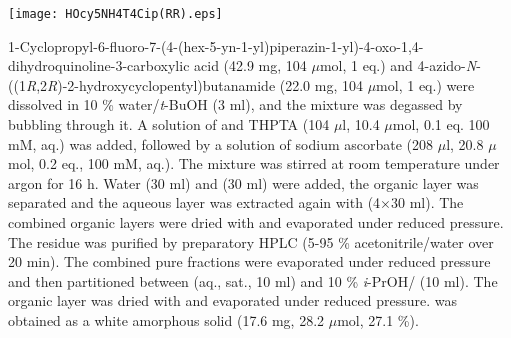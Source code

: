 
\begin{scheme}[H]
	\begin{center}
		\texttt{[image: HOcy5NH4T4Cip(RR).eps]}
	\end{center}
\end{scheme}

1-Cyclopropyl-6-fluoro-7-(4-(hex-5-yn-1-yl)piperazin-1-yl)-4-oxo-1,4\hyp{}dihydro\-quinoline-3-carboxylic acid  (42.9 mg, 104 $\mu$mol, 1 eq.) and 4\hyp{}azido\hyp{}\textit{N}\hyp{}((1\textit{R},2\textit{R})\hyp{}2\hyp{}hydroxycyclopentyl)butanamide  (22.0 mg, 104 $\mu$mol, 1 eq.) were dissolved in 10 \% water/\textit{t}-BuOH (3 ml), and the mixture was degassed by bubbling  through it. 
A solution of  and THPTA (104 $\mu$l, 10.4 $\mu$mol, 0.1 eq. 100 mM, aq.) was added, followed by a solution of sodium ascorbate (208 $\mu$l, 20.8 $\mu$mol, 0.2 eq., 100 mM, aq.). 
The mixture was stirred at room temperature under argon for 16 h. Water (30 ml) and  (30 ml) were added, the organic layer was separated and the aqueous layer was extracted again with  (4$\times$30 ml). The combined organic layers were dried with  and evaporated under reduced pressure. The residue was purified by preparatory HPLC (5-95 \% acetonitrile/water over 20 min). The combined pure fractions were evaporated under reduced pressure and then partitioned between  (aq., sat., 10 ml) and 10 \% \textit{i}-PrOH/ (10 ml). The organic layer was dried with  and evaporated under reduced pressure.
 was obtained as a white amorphous solid (17.6 mg, 28.2 $\mu$mol, 27.1 \%).
\\[1\baselineskip]
\\[1\baselineskip]
